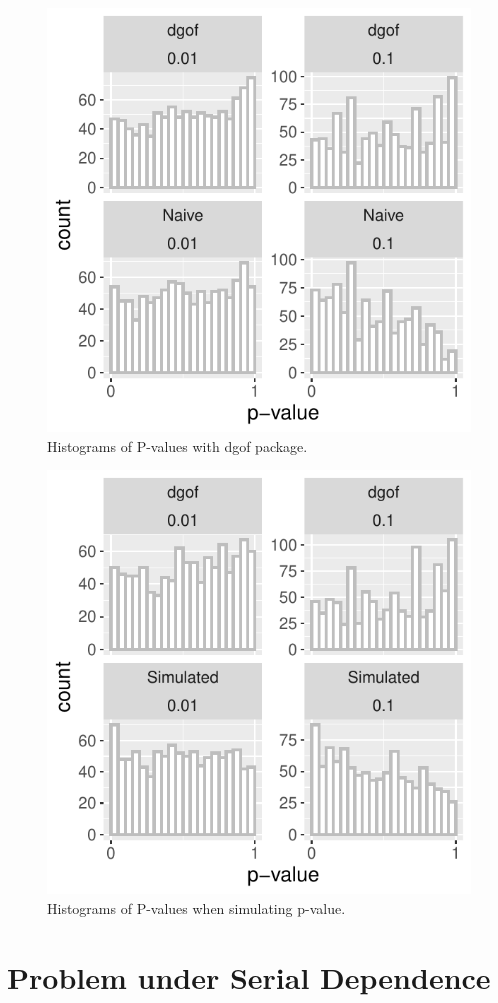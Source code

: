 \documentclass[12pt, letterpaper, titlepage]{article}
\begin{document}
\begin{figure}[!ht]
  \centering
  \includegraphics[width=0.8\linewidth]{hist_dgof}
  \caption{Histograms of P-values with dgof package.}
  \label{fig:hist_dgof}
\end{figure}

\begin{figure}[!ht]
  \centering
  \includegraphics[width=0.8\linewidth]{hist_dgofsim}
  \caption{Histograms of P-values when simulating p-value.}
  \label{fig:hist_dgofsim}
\end{figure}

\hypertarget{sec:correlation}{%
\section{Problem under Serial Dependence}\label{sec:correlation}}
\end{document}
